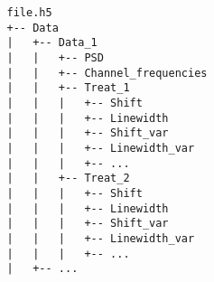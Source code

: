 \documentclass{article}
\begin{document}
            \begin{verbatim}
                file.h5
                +-- Data
                |   +-- Data_1
                |   |   +-- PSD
                |   |   +-- Channel_frequencies
                |   |   +-- Treat_1
                |   |   |   +-- Shift
                |   |   |   +-- Linewidth
                |   |   |   +-- Shift_var
                |   |   |   +-- Linewidth_var
                |   |   |   +-- ...
                |   |   +-- Treat_2
                |   |   |   +-- Shift
                |   |   |   +-- Linewidth
                |   |   |   +-- Shift_var
                |   |   |   +-- Linewidth_var
                |   |   |   +-- ...
                |   +-- ...
            \end{verbatim}
\end{document}
